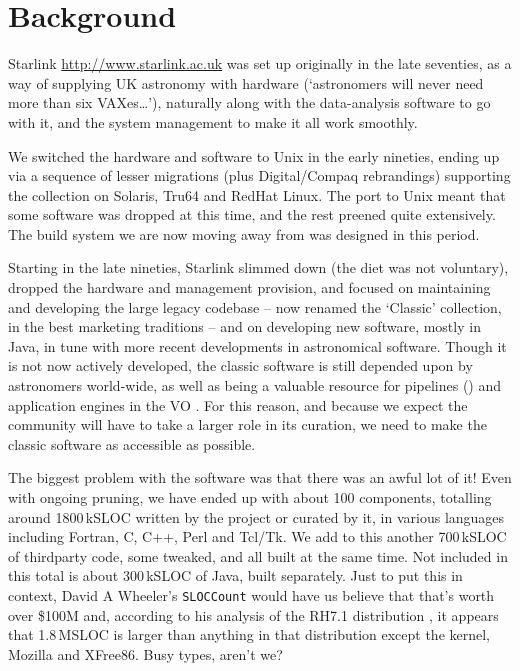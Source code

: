 \documentclass{speauth}
\begin{document}
\section{Background}
\label{s:background}


Starlink \url{http://www.starlink.ac.uk} was set up
originally in the late seventies, as a way of supplying UK astronomy
with hardware (`astronomers will never need more than six
VAXes\dots'), naturally along with the data-analysis software to go
with it, and the system management to make it all work smoothly.

We switched the hardware and software to Unix in the early nineties,
ending up via a sequence of lesser migrations (plus Digital/Compaq
rebrandings) supporting the collection on Solaris, Tru64 and RedHat
Linux.  The port to Unix meant that some software was dropped at this
time, and the rest preened quite extensively.  The build system we are
now moving away from was designed in this period.

Starting in the late nineties, Starlink slimmed down (the diet was not
voluntary), dropped the hardware and management provision, and focused
on maintaining and developing the large legacy codebase -- now renamed
the `Classic' collection, in the best marketing traditions -- and on
developing new software, mostly in Java, in tune with more recent
developments in astronomical software.  Though it is not now actively
developed, the classic software is still depended upon by astronomers
world-wide, as well as being a valuable resource for pipelines
(\cite{cavanagh03,currie04}) and application engines in the VO
\cite{giaretta05}.
For this reason, and because we expect the community will have to take
a larger role in its curation, we need to make the classic software as
accessible as possible.

The biggest problem with the software was that there was an awful lot
of it!  Even with ongoing pruning, we have ended up with about 100
components, totalling around 1800\,kSLOC written by the project or
curated by it, in various languages
including Fortran, C, C++, Perl and Tcl/Tk.  We add to this another
700\,kSLOC of thirdparty code, some tweaked, and all built at the same
time.  Not included in this total is about 300\,kSLOC of Java,
built separately.  Just to put this in context, David A
Wheeler's \texttt{SLOCCount} would have us believe that that's worth
over \$100M and, according to his analysis of the RH7.1 distribution
\cite{wheeler02}, it appears that 1.8\,MSLOC is larger than anything in
that distribution except the kernel, Mozilla and XFree86.  Busy types,
aren't we?
\end{document}
